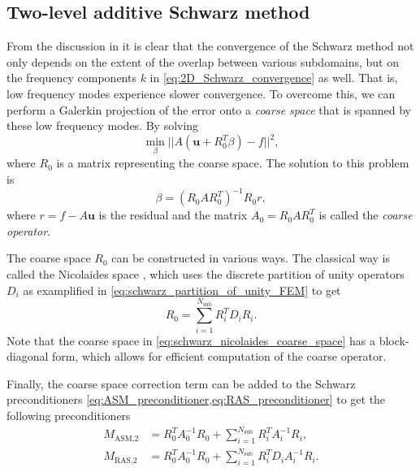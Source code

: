 \subsection{Two-level additive Schwarz method}\label{sec:schwarz_coarse_space}
From the discussion in  it is clear that the convergence of the Schwarz method not only depends on the extent of the overlap between various subdomains, but on the frequency components $k$ in \cref{eq:2D_Schwarz_convergence} as well. That is, low frequency modes experience slower convergence. To overcome this, we can perform a Galerkin projection of the error onto a \textit{coarse space} that is spanned by these low frequency modes. By solving
\[
  \min_{\beta} ||A(\mathbf{u} + R_0^T\beta) - f||^2,
\]
where $R_0$ is a matrix representing the coarse space. The solution to this problem is
\[
  \beta = (R_0 A R_0^T)^{-1} R_0 r,
\]
where $r = f - A \mathbf{u}$ is the residual and the matrix $A_0 = R_0 A R_0^T$ is called the \textit{coarse operator}.

The coarse space $R_0$ can be constructed in various ways. The classical way is called the Nicolaides space \cite[Section 4.2]{schwarz_methods_Dolean_2015}, which uses the discrete partition of unity operators $D_i$ as examplified in \cref{eq:schwarz_partition_of_unity_FEM} to get
\begin{equation}
  R_0 = \sum_{i=1}^{N_{\text{sub}}} R_i^T D_i R_i.
  \label{eq:schwarz_nicolaides_coarse_space}
\end{equation}
Note that the coarse space in \cref{eq:schwarz_nicolaides_coarse_space} has a block-diagonal form, which allows for efficient computation of the coarse operator.

Finally, the coarse space correction term can be added to the Schwarz preconditioners \cref{eq:ASM_preconditioner,eq:RAS_preconditioner} to get the following preconditioners
\begin{subequations}
  \begin{align}
    M_{\text{ASM,2}} & = R_0^T A_0^{-1} R_0 + \sum_{i=1}^{N_{\text{sub}}} R_i^T A_i^{-1} R_i , \label{eq:ASM_preconditioner_coarse}    \\
    M_{\text{RAS,2}} & = R_0^T A_0^{-1} R_0 + \sum_{i=1}^{N_{\text{sub}}} R_i^T D_i A_i^{-1} R_i \label{eq:RAS_preconditioner_coarse}.
  \end{align}
\end{subequations}

